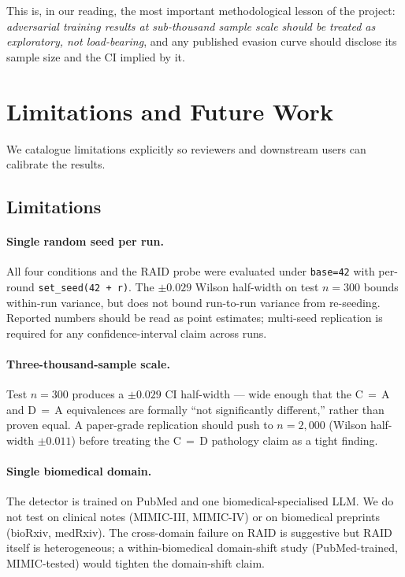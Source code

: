 \documentclass[conference]{IEEEtran}
\begin{document}
This is, in our reading, the most important methodological lesson of
the project: \emph{adversarial training results at sub-thousand sample
scale should be treated as exploratory, not load-bearing}, and any
published evasion curve should disclose its sample size and the CI
implied by it.

\section{Limitations and Future Work}
\label{sec:limitations}

We catalogue limitations explicitly so reviewers and downstream users can
calibrate the results.

\subsection{Limitations}

\paragraph{Single random seed per run.}
All four conditions and the RAID probe were evaluated under
\texttt{base=42} with per-round \texttt{set\_seed(42 + r)}. The
\(\pm 0.029\) Wilson half-width on test \(n=300\) bounds within-run
variance, but does not bound run-to-run variance from re-seeding.
Reported numbers should be read as point estimates; multi-seed
replication is required for any confidence-interval claim across
runs.

\paragraph{Three-thousand-sample scale.}
Test \(n=300\) produces a \(\pm 0.029\) CI half-width — wide enough that
the C\,$=$\,A and D\,$=$\,A equivalences are formally ``not significantly
different,'' rather than proven equal. A paper-grade replication should
push to \(n=2{,}000\) (Wilson half-width \(\pm 0.011\)) before treating
the C\,$=$\,D pathology claim as a tight finding.

\paragraph{Single biomedical domain.}
The detector is trained on PubMed and one biomedical-specialised LLM. We
do not test on clinical notes (MIMIC-III, MIMIC-IV) or on biomedical
preprints (bioRxiv, medRxiv). The cross-domain failure on RAID is
suggestive but RAID itself is heterogeneous; a within-biomedical
domain-shift study (PubMed-trained, MIMIC-tested) would tighten the
domain-shift claim.
\end{document}
